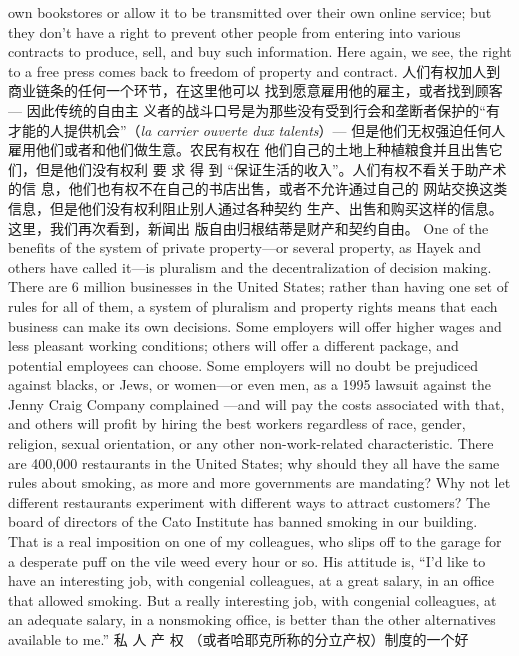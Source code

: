 \begin{paracol}{2}
own bookstores or allow it to be transmitted over their own online service; but they don't have a right to prevent other people
from entering into various contracts to produce, sell, and buy
such information. Here again, we see, the right to a free press
comes back to freedom of property and contract.
\switchcolumn
人们有权加人到商业链条的任何一个环节，在这里他可以
找到愿意雇用他的雇主，或者找到顾客 --- 因此传统的自由主
义者的战斗口号是为那些没有受到行会和垄断者保护的“有才能的人提供机会”（\textit{la carrier ouverte dux talents}）--- 但是他们无权强迫任何人雇用他们或者和他们做生意。农民有权在
他们自己的土地上种植粮食并且出售它们，但是他们没有权利
要 求 得 到 “保证生活的收入”。人们有权不看关于助产术的信
息，他们也有权不在自己的书店出售，或者不允许通过自己的
网站交换这类信息，但是他们没有权利阻止别人通过各种契约
生产、出售和购买这样的信息。这里，我们再次看到，新闻出
版自由归根结蒂是财产和契约自由。
\switchcolumn*
One of the benefits of the system of private property---or
several property, as Hayek and others have called it---is pluralism and the decentralization of decision making. There are 6
million businesses in the United States; rather than having one
set of rules for all of them, a system of pluralism and property
rights means that each business can make its own decisions.
Some employers will offer higher wages and less pleasant working conditions; others will offer a different package, and potential employees can choose. Some employers will no doubt be
prejudiced against blacks, or Jews, or women---or even men, as
a 1995 lawsuit against the Jenny Craig Company complained
---and will pay the costs associated with that, and others will profit by hiring the best workers regardless of race, gender, religion, sexual orientation, or any other non-work-related characteristic. There are 400,000 restaurants in the United States;
why should they all have the same rules about smoking, as
more and more governments are mandating? Why not let different restaurants experiment with different ways to attract
customers? The board of directors of the Cato Institute has
banned smoking in our building. That is a real imposition on
one of my colleagues, who slips off to the garage for a desperate
puff on the vile weed every hour or so. His attitude is, ``I'd like
to have an interesting job, with congenial colleagues, at a great
salary, in an office that allowed smoking. But a really interesting job, with congenial colleagues, at an adequate salary, in a
nonsmoking office, is better than the other alternatives available to me.''
\switchcolumn
私 人 产 权 （或者哈耶克所称的分立产权）制度的一个好

\end{paracol}
